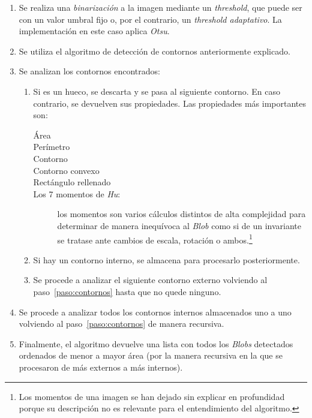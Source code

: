 \begin{enumerate}
\item Se realiza una \emph{binarización} a la imagen mediante un
  \emph{threshold}, que puede ser con un valor umbral fijo o, por el
  contrario, un \emph{threshold adaptativo}. La implementación en este
  caso aplica \emph{Otsu}.
\item Se utiliza el algoritmo de detección de contornos anteriormente
  explicado.
\item Se analizan los contornos encontrados:
  \begin{enumerate}[label*=\arabic*.]
  \item\label{paso:contornos} Si es un hueco, se descarta y se pasa al
    siguiente contorno. En caso contrario, se devuelven sus
    propiedades. Las propiedades más importantes son:
    \begin{description}
    \item[Área]
    \item[Perímetro]
    \item[Contorno]
    \item[Contorno convexo]
    \item[Rectángulo rellenado]
    \item[Los 7 momentos de \emph{Hu}:] los momentos son varios
      cálculos distintos de alta complejidad para determinar de manera
      inequívoca al \emph{Blob} como si de un invariante se tratase
      ante cambios de escala, rotación o ambos.\footnote{Los momentos
        de una imagen se han dejado sin explicar en profundidad porque
        su descripción no es relevante para el entendimiento del
        algoritmo.}
    \end{description}
  \item Si hay un contorno interno, se almacena para procesarlo
    posteriormente.
  \item Se procede a analizar el siguiente contorno externo volviendo
    al paso~\ref{paso:contornos} hasta que no quede ninguno.
  \end{enumerate}
\item Se procede a analizar todos los contornos internos almacenados
  uno a uno volviendo al paso~\ref{paso:contornos} de manera
  recursiva.
\item Finalmente, el algoritmo devuelve una lista con todos los
  \emph{Blobs} detectados ordenados de menor a mayor área (por la
  manera recursiva en la que se procesaron de más externos a más
  internos).
\end{enumerate}

